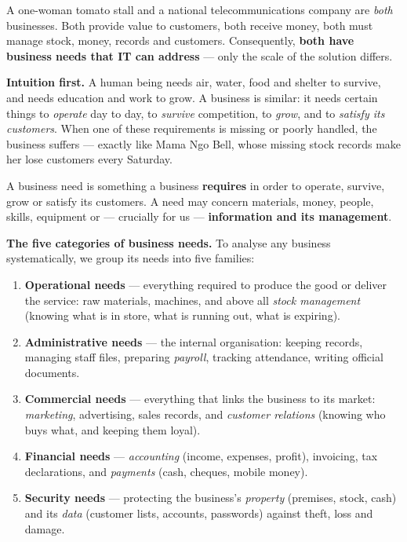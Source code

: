\documentclass[11pt]{article}
\newcommand{\cle}[1]{{\popxbold\color{popdark}#1}}
\newcounter{popsec}
\newcounter{popsub}
\newcommand{\courssub}[1]{%
  \stepcounter{popsub}%
  \par\vspace{9pt}\noindent{\popxbold\fontsize{11.5}{13}\selectfont\color{popink}{\color{poporange}\thepopsec.\thepopsub}\hspace{6pt}#1}\par\nopagebreak\vspace{4pt}
}
\begin{document}
\begin{attention}
A one-woman tomato stall and a national telecommunications company are \emph{both} businesses. Both provide value to customers, both receive money, both must manage stock, money, records and customers. Consequently, \textbf{both have business needs that IT can address} — only the scale of the solution differs.
\end{attention}

\courssub{What Is a Business Need?}

\textbf{Intuition first.} A human being needs air, water, food and shelter to survive, and needs education and work to grow. A business is similar: it needs certain things to \emph{operate} day to day, to \emph{survive} competition, to \emph{grow}, and to \emph{satisfy its customers}. When one of these requirements is missing or poorly handled, the business suffers — exactly like Mama Ngo Bell, whose missing stock records make her lose customers every Saturday.

\begin{definition}
A \cle{business need} is something a business \textbf{requires} in order to operate, survive, grow or satisfy its customers. A need may concern materials, money, people, skills, equipment or — crucially for us — \textbf{information and its management}.
\end{definition}

\textbf{The five categories of business needs.} To analyse any business systematically, we group its needs into five families:

\begin{enumerate}
\item \textbf{Operational needs} — everything required to produce the good or deliver the service: raw materials, machines, and above all \emph{stock management} (knowing what is in store, what is running out, what is expiring).
\item \textbf{Administrative needs} — the internal organisation: keeping records, managing staff files, preparing \emph{payroll}, tracking attendance, writing official documents.
\item \textbf{Commercial needs} — everything that links the business to its market: \emph{marketing}, advertising, sales records, and \emph{customer relations} (knowing who buys what, and keeping them loyal).
\item \textbf{Financial needs} — \emph{accounting} (income, expenses, profit), invoicing, tax declarations, and \emph{payments} (cash, cheques, mobile money).
\item \textbf{Security needs} — protecting the business's \emph{property} (premises, stock, cash) and its \emph{data} (customer lists, accounts, passwords) against theft, loss and damage.
\end{enumerate}
\end{document}
